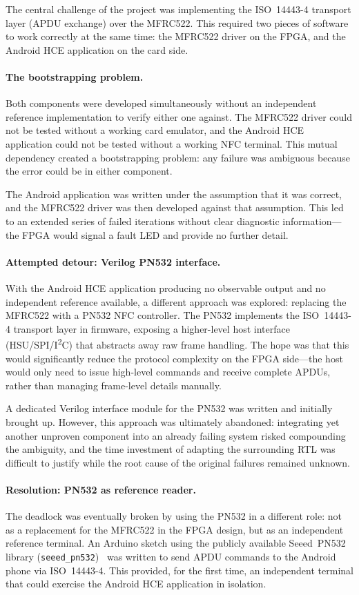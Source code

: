 \documentclass[manuscript,screen,nonacm]{acmart}
\begin{document}
The central challenge of the project was implementing the ISO~14443-4
transport layer (APDU exchange) over the MFRC522.
This required two pieces of software to work correctly at the same time:
the MFRC522 driver on the FPGA, and the Android HCE application on the
card side.

\paragraph{The bootstrapping problem.}
Both components were developed simultaneously without an independent
reference implementation to verify either one against.
The MFRC522 driver could not be tested without a working card
emulator, and the Android HCE application could not be tested without
a working NFC terminal.
This mutual dependency created a bootstrapping problem:
any failure was ambiguous because the error could be in either component.

The Android application was written under the assumption that it
was correct, and the MFRC522 driver was then developed against that
assumption.
This led to an extended series of failed iterations
without clear diagnostic information—the FPGA would signal a fault
LED and provide no further detail.

\paragraph{Attempted detour: Verilog PN532 interface.}
With the Android HCE application producing no observable output and no
independent reference available, a different approach was explored:
replacing the MFRC522 with a PN532 NFC controller.
The PN532 implements the ISO~14443-4 transport layer in firmware,
exposing a higher-level host interface (HSU/SPI/I\textsuperscript{2}C)
that abstracts away raw frame handling.
The hope was that this would significantly reduce the protocol
complexity on the FPGA side—the host would only need to issue
high-level commands and receive complete APDUs, rather than managing
frame-level details manually.

A dedicated Verilog interface module for the PN532 was written and
initially brought up.
However, this approach was ultimately abandoned: integrating yet
another unproven component into an already failing system risked
compounding the ambiguity, and the time investment of adapting
the surrounding RTL was difficult to justify while the root cause of
the original failures remained unknown.

\paragraph{Resolution: PN532 as reference reader.}
The deadlock was eventually broken by using the PN532 in a different
role: not as a replacement for the MFRC522 in the FPGA design, but as
an independent reference terminal.
An Arduino sketch using the publicly available Seeed~PN532 library
(\texttt{seeed\_pn532})~\cite{seeed_pn532} was written to send APDU commands to the
Android phone via ISO~14443-4.
This provided, for the first time, an independent terminal that could
exercise the Android HCE application in isolation.
\end{document}
